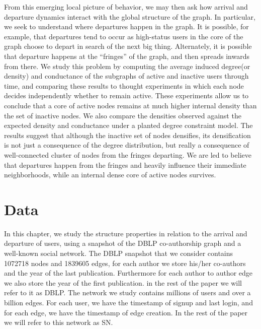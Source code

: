 \documentclass[phd,tocprelim]{cornell}
\begin{document}
From this emerging local picture of behavior, we may then ask how
arrival and departure dynamics interact with the global structure of
the graph.  In particular, we seek to understand where departures
happen in the graph.  It is possible, for example, that departures
tend to occur as high-status users in the core of the graph choose to
depart in search of the next big thing.  Alternately, it is possible
that departure happens at the ``fringes'' of the graph, and then
spreads inwards from there.  We study this problem by computing the
average induced degree(or density) and conductance of the subgraphs of active and inactive users
through time, and comparing these results to thought experiments in
which each node decides independently whether to remain active.  These
experiments allow us to conclude that a core of active nodes remains
at much higher internal density than the set of inactive nodes. We
also compare the densities observed against the expected density and
conductance under a planted degree constraint model.  The results
suggest that although the inactive set of nodes densifies, its densification is
not just a consequence of the degree distribution, but really a
consequence of well-connected cluster of nodes from the fringes
departing.  We are led to believe that departures happen from the
fringes and heavily influence their immediate neighborhoods, while
an internal dense core of active nodes survives.

\section{Data}

In this chapter, we study the structure properties in relation to the arrival and departure of users, using a snapshot
of the DBLP co-authorship graph and a well-known social network.  The DBLP snapshot
that we consider contains 1072718 nodes and 1839605 edges, for each author we store his/her co-authors
and the year of the last publication. Furthermore for each author to author edge we also
store the year of the first publication. in the rest of the paper we will refer to
it as DBLP. The network we study contains millions of
users and over a billion edges.  For each user, we have the timestamp
of signup and last login, and for each edge, we have the timestamp of
edge creation. In the rest of the paper we will refer to this network as SN.  
\end{document}
